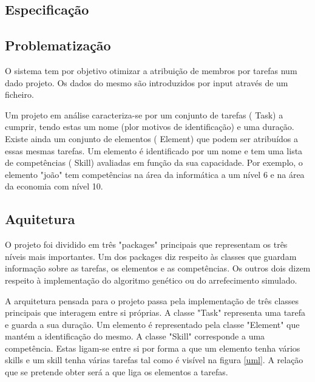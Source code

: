 \begin{titlepage}

\newpage %


\section{Especificação}

\subsection{Problematização}
\justify\normalsize
O sistema tem por objetivo otimizar a atribuição de membros por tarefas num dado projeto. Os dados do mesmo são introduzidos por input através de um ficheiro.

Um projeto em análise caracteriza-se por um conjunto de tarefas ( Task) a cumprir, tendo estas um nome (plor motivos de identificação) e uma duração. Existe ainda um conjunto de elementos ( Element) que podem ser atribuídos a essas mesmas tarefas. Um elemento é identificado por um nome e tem uma lista de competências ( Skill) avaliadas em função da sua capacidade. Por exemplo, o elemento "joão" tem competências na área da informática a um nível 6 e na área da economia com nível 10.

\subsection{Aquitetura}
\justify\normalsize
O projeto foi dividido em três "packages" principais que representam os três níveis mais importantes. Um dos packages diz respeito às classes que guardam informação sobre as tarefas, os elementos e as competências. Os outros dois dizem respeito à implementação do algoritmo genético ou do arrefecimento simulado.

A arquitetura pensada para o projeto passa pela implementação de três classes principais que interagem entre si próprias. A classe "Task" representa uma tarefa e guarda a sua duração. Um elemento é representado pela classe "Element" que mantém a identificação do mesmo. A classe "Skill" corresponde a uma competência. Estas ligam-se entre si por forma a que um elemento tenha vários skills e um skill tenha várias tarefas tal como é visível na figura \ref{uml}. A relação que se pretende obter será a que liga os elementos a tarefas.


\end{titlepage}
